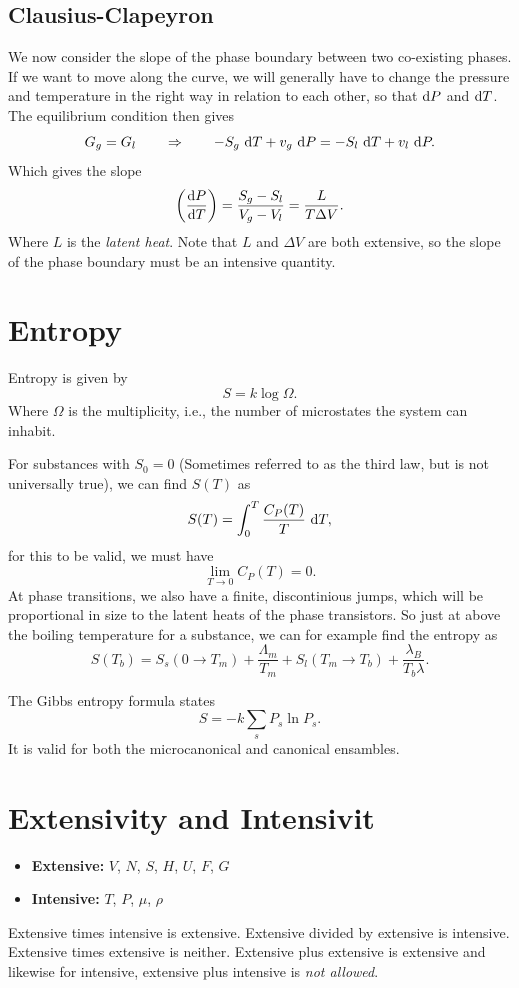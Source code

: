 \documentclass[a4paper, 11pt, notitlepage, english]{article}
\renewcommand{\d}{{\rm d}}
\newcommand{\To}{\quad\Rightarrow\quad}
\begin{document}
\subsection*{Clausius-Clapeyron}
We now consider the slope of the phase boundary between two co-existing phases. If we want to move along the curve, we will generally have to change the pressure and temperature in the right way in relation to each other, so that $\d P$ and $\d T$. The equilibrium condition then gives
$$G_g = G_l \quad \To \quad -S_g \ \d T + v_g \ \d P = - S_l \ \d T + v_l \ \d P.$$
Which gives the slope
$$\bigg(\frac{\d P}{\d T}\bigg) = \frac{S_g - S_l}{V_g - V_l} = \frac{L}{T\Delta V}.$$
Where $L$ is the \emph{latent heat}. Note that $L$ and $\Delta V$ are both extensive, so the slope of the phase boundary must be an intensive quantity.

\section*{Entropy}
Entropy is given by
$$S = k \log \Omega.$$
Where $\Omega$ is the multiplicity, i.e., the number of microstates the system can inhabit.

For substances with $S_0 = 0$ (Sometimes referred to as the third law, but is not universally true), we can find $S(T)$ as
$$S(T) = \int_0^T \frac{C_{P}(T)}{T} \ \d T,$$
for this to be valid, we must have 
$$\lim_{T \to 0} C_P(T) = 0.$$
At phase transitions, we also have a finite, discontinious jumps, which will be proportional in size to the latent heats of the phase transistors. So just at above the boiling temperature for a substance, we can for example find the entropy as
$$S(T_b) = S_s(0\to T_m) + \frac{\Lambda_m}{T_m} + S_l(T_m \to T_b) + \frac{\lambda_B}{T_b\lambda}.$$

The Gibbs entropy formula states
$$S = -k \sum_s P_s \ln P_s.$$
It is valid for both the microcanonical and canonical ensambles.


\section*{Extensivity and Intensivit}
\begin{itemize}
	\item \textbf{Extensive:} $V$, $N$, $S$, $H$, $U$, $F$, $G$ 
	\item \textbf{Intensive:} $T$, $P$, $\mu$, $\rho$
\end{itemize}
Extensive times intensive is extensive. Extensive divided by extensive is intensive. Extensive times extensive is neither. Extensive plus extensive is extensive and likewise for intensive, extensive plus intensive is \emph{not allowed}.
\end{document}
